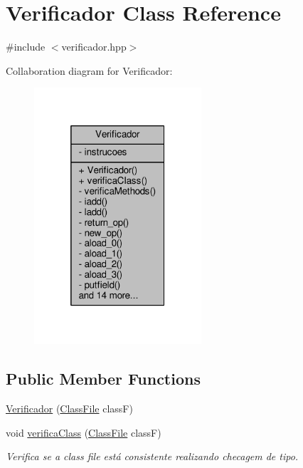 \hypertarget{classVerificador}{\section{Verificador Class Reference}
\label{classVerificador}
}


{\ttfamily \#include $<$verificador.\+hpp$>$}



Collaboration diagram for Verificador\+:\nopagebreak
\begin{figure}[H]
\begin{center}
\leavevmode
\includegraphics[width=176pt]{classVerificador__coll__graph}
\end{center}
\end{figure}
\subsection*{Public Member Functions}
\begin{DoxyCompactItemize}
\item 
\hyperlink{classVerificador_ac51211fc9ca6bc4f6458689d297fd975}{Verificador} (\hyperlink{classClassFile}{Class\+File} class\+F)
\item 
void \hyperlink{classVerificador_a2733fc90d16afa8273cd09b0d3a34f91}{verifica\+Class} (\hyperlink{classClassFile}{Class\+File} class\+F)
\begin{DoxyCompactList}\small\item\em Verifica se a class file está consistente realizando checagem de tipo. \end{DoxyCompactList}\end{DoxyCompactItemize}
